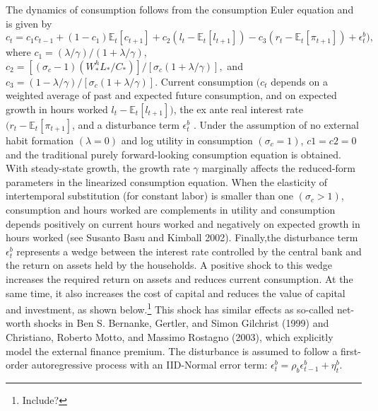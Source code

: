 \documentclass[11pt]{article}
\newcommand{\E}{\mathbb{E}}
\newcommand{\cobs}[1]{c_{#1}}
\newcommand{\lobs}[1]{l_{#1}}
\newcommand{\robs}[1]{r_{#1}}
\newcommand{\piobs}[1]{\pi_{#1}}
\newcommand{\consumption}{consumption}
\newcommand{\investment}{investment}
\newcommand{\hours}{hours worked}
\newcommand{\realinterest}{real interest rate}
\newcommand{\labor}{labor}
\newcommand{\interest}{interest rate}
\begin{document}
The dynamics of \consumption{} follows from the \consumption{} Euler
equation and is given by \begin{equation}
  \cobs{t} = c_1\cobs{t-1} + (1-c_1)\E_t[\cobs{t+1}] + c_2 (\lobs{t}
  -\E_t[\lobs{t+1}]) - c_3(\robs{t}-\E_t[\piobs{t+1}])+\epsilon_t^b),
\end{equation} where \(c_1 = (\lambda/\gamma)/(1+\lambda/\gamma)\),
\(c_2 = [(\sigma_c - 1)(W_*^h L_*/C_*)] / [\sigma_c(1+\lambda/\gamma)],\)
and \(c_3 = (1-\lambda/\gamma)/[\sigma_c(1+\lambda/\gamma)]\). Current
\consumption{} \((\cobs{t}\) depends on a weighted average of past and
expected future \consumption, and on expected growth in \hours{}
\(\lobs{t}  -\E_t[\lobs{t+1}])\), the ex ante \realinterest{}
\((\robs{t}-\E_t[\piobs{t+1}]\), and a disturbance term \(\epsilon^b_t\)
. Under the assumption of no external habit formation \((\lambda=0)\)
and log utility in \consumption{} \((\sigma_c =1)\), \(c1 = c2 = 0\) and
the traditional purely forward-looking \consumption{} equation is
obtained. With steady-state growth, the growth rate \(\gamma\)
marginally affects the reduced-form parameters in the linearized
\consumption{} equation. When the elasticity of intertemporal
substitution (for constant \labor) is smaller than one
\((\sigma_c > 1)\), \consumption{} and \hours{} are complements in
utility and \consumption{} depends positively on current \hours{} and
negatively on expected growth in \hours{} (see Susanto Basu and Kimball
2002). Finally,the disturbance term \(\epsilon_t^b\) represents a wedge
between the \interest{} controlled by the central bank and the return on
assets held by the households. A positive shock to this wedge increases
the required return on assets and reduces current \consumption. At the
same time, it also increases the cost of capital and reduces the value
of capital and \investment, as shown below.\footnote{Include?} This
shock has similar effects as so-called net-worth shocks in Ben S.
Bernanke, Gertler, and Simon Gilchrist (1999) and Christiano, Roberto
Motto, and Massimo Rostagno (2003), which explicitly model the external
finance premium. The disturbance is assumed to follow a first-order
autoregressive process with an IID-Normal error term:
\(\epsilon_t^b = \rho_b\epsilon_{t-1}^b + \eta_t^b\).
\end{document}
